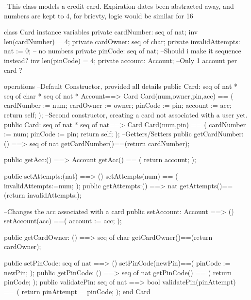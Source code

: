 \documentclass[a4paper]{article}
\begin{document}
\title{}
\author{}
\begin{vdm_al}
--This class models a credit card. Expiration dates been abstracted away, and numbers are kept to 4, for brievty, logic would be similar for 16

class Card
instance variables
    private cardNumber: seq of nat;
    inv len(cardNumber) = 4;
    private cardOwner: seq of char;
    private invalidAttempts: nat := 0;
    -- no numbers
    private pinCode: seq of nat; --Should i make it sequence instead?
    inv len(pinCode) = 4;
    private account: Account; --Only 1 account per card ? 
    
operations
    --Default Constructor, provided all details
    public Card: seq of nat  * seq of char * seq of nat * Account==> Card
    Card(num,owner,pin,acc) == (
        cardNumber := num;
        cardOwner := owner;
        pinCode := pin;
        account := acc;
        return self;
    );
    --Second constructor, creating a card not associated with a user yet.
    public Card: seq of nat * seq of nat==> Card
    Card(num,pin) == (
        cardNumber := num;
        pinCode := pin;
        return self;
    );
    --Getters/Setters
    public getCardNumber: () ==> seq of nat
    getCardNumber()==(return cardNumber);
    
    public getAcc:() ==> Account
    getAcc() == (
        return account;
    );

    public setAttempts:(nat) ==> ()
    setAttempts(num) == (
        invalidAttempts:=num;
    );
    public getAttempts:() ==> nat
    getAttempts()==(return invalidAttempts;);

    --Changes the acc associated with a card
    public setAccount: Account ==> () 
    setAccount(acc) ==(
        account := acc;
    );

    public getCardOwner: () ==> seq of char
    getCardOwner()==(return cardOwner);

    public setPinCode: seq of nat ==> ()
    setPinCode(newPin)==(
        pinCode := newPin;
    );
    public getPinCode: () ==> seq of nat 
    getPinCode() == (
        return pinCode;
    );
    public validatePin: seq of nat ==> bool
    validatePin(pinAttempt) == (
        return pinAttempt = pinCode;
    );
end Card
\end{vdm_al}
\bigskip
\end{document}
